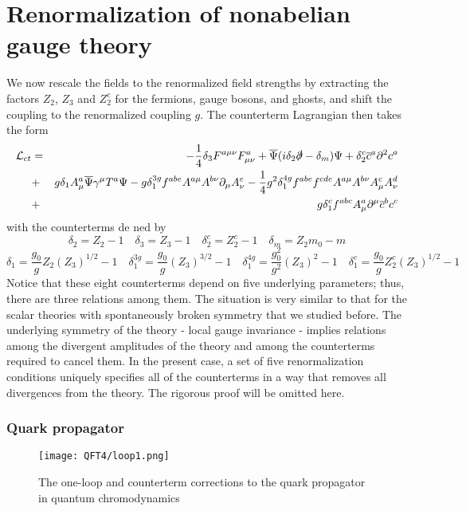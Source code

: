 \documentclass[cyan]{elegantnote}
\begin{document}
\section{Renormalization of nonabelian gauge theory}
We now rescale the fields to the renormalized field strengths by extracting the factors $Z_2$, $Z_3$ and $Z_2^c$ for the fermions, gauge bosons, and ghosts, and shift the coupling to the renormalized coupling $g$. The counterterm Lagrangian then takes the form
\begin{eqnarray}
\mathcal{L}_{ct} &=& -\frac{1}{4}\delta_3 F^{a\mu\nu}F^a_{\mu\nu} + \overline{\Psi}(i\delta_2\slashed{\partial}-\delta_m)\Psi + \delta_2^c \overline{c}^a \partial^2 c^a \nonumber \\
&+& g\delta_1 A^a_{\mu}\overline{\Psi}\gamma^{\mu}T^a\Psi -g\delta_{1}^{3g} f^{abe}A^{a\mu}A^{b\nu}\partial_{\mu}A^e_{\nu} - \frac{1}{4}g^2\delta_1^{4g} f^{abe}f^{cde}A^{a\mu}A^{b\nu}A^c_{\mu}A^d_{\nu} \nonumber \\
&+& g\delta_1^c f^{abc}A^a_{\mu}\partial^{\mu}\overline{c}^b c^c \nonumber
\end{eqnarray}
with the counterterms de ned by
\[\delta_2 = Z_2 - 1 \quad \delta_3 = Z_3 - 1 \quad \delta_2^c = Z_2^c - 1 \quad \delta_m = Z_2m_0-m\]
\[\delta_1 = \frac{g_0}{g}Z_2(Z_3)^{1/2} - 1 \quad \delta_1^{3g} = \frac{g_0}{g}(Z_3)^{3/2} - 1 \quad \delta_1^{4g} = \frac{g_0^2}{g^2}(Z_3)^2 - 1 \quad \delta_1^c = \frac{g_0}{g}Z_2^c(Z_3)^{1/2} - 1\]
Notice that these eight counterterms depend on five underlying parameters; thus, there are three relations among them. The situation is very similar to that for the scalar theories with spontaneously broken symmetry that we studied before. 
The underlying symmetry of the theory - local gauge invariance - implies relations among the divergent amplitudes of the theory and among the counterterms required to cancel them. 
In the present case, a set of five renormalization conditions uniquely specifies all of the counterterms in a way that removes all divergences from the theory.
The rigorous proof will be omitted here.

\subsubsection{Quark propagator}
\begin{figure}[!h]
	\centering
	\texttt{[image: QFT4/loop1.png]}
	\caption{The one-loop and counterterm corrections to the quark propagator in quantum chromodynamics}
\end{figure}
\end{document}
